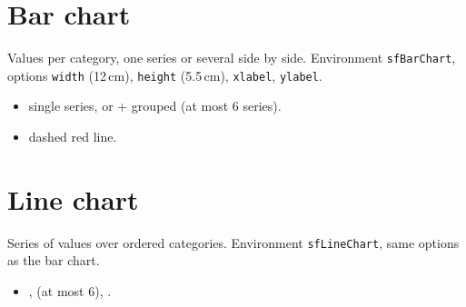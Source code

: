 
\section{Bar chart}

Values per category, one series or several side by side. Environment \texttt{sfBarChart}, options \texttt{width} (12\,cm), \texttt{height} (5.5\,cm), \texttt{xlabel}, \texttt{ylabel}.

\begin{itemize}
  \item {} single series, or  +  grouped (at most 6 series).
  \item {} dashed red line.
\end{itemize}


\section{Line chart}

Series of values over ordered categories. Environment \texttt{sfLineChart}, same options as the bar chart.

\begin{itemize}
  \item {},  (at most 6), .
\end{itemize}

